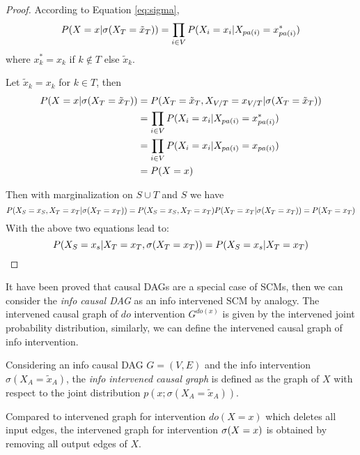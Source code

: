 \begin{proof}
	According to Equation \ref{eq:sigma}, 
	$$
	P(X=x|\mathrm{\sigma}(X_T=\tilde{x}_T)) = \prod_{i\in V} P(X_i = x_i|X_{pa(i)} = x^*_{pa(i)})
	$$
	where $x^*_k = x_k$ if $k \notin T$ else $\tilde{x}_k$.
	
	 Let $\tilde{x}_k = x_k$ for $k \in T$, then 
	\begin{align*}
		P(X=x|\mathrm{\sigma}(X_T=\tilde{x}_T))  &= P(X_T = \tilde{x}_T, X_{V/T} = x_{V/T}| \mathrm{\sigma}(X_T=\tilde{x}_T))  \\
		&=  \prod_{i\in V} P(X_i = x_i|X_{pa(i)} = x^*_{pa(i)}) \\
		&=  \prod_{i\in V} P(X_i = x_i|X_{pa(i)} = x_{pa(i)}) \\
		&= P(X=x) 
	\end{align*}
	
	Then with marginalization on $S \cup T$ and $S$ we have 
	$$
	P(X_S=x_S, X_T = {x}_T|\mathrm{\sigma}(X_T={x}_T)) = P(X_S=x_S, X_T = {x}_T) \\
	P( X_T = {x}_T|\mathrm{\sigma}(X_T={x}_T)) = P(X_T = {x}_T)
	$$ 
   With the above two equations lead to:
    $$P(X_S=x_s|X_T=x_T, \mathrm{\sigma}(X_T=x_T)) = P(X_S=x_s|X_T=x_T)$$
\end{proof}


It have been proved that causal DAGs are a special case of SCMs, then we can consider the \emph{info causal DAG} as an info intervened SCM {{by analogy}}. The intervened causal graph of $do$ intervention $G^{do(x)}$ is given by the intervened joint probability distribution, similarly, we can define the intervened causal graph of info intervention. 

\begin{Def}
	Considering an info causal DAG $G = (V, E)$ and the info intervention $\sigma(X_A = \tilde{x}_A)$, the \emph{info intervened causal graph} is defined as the graph of $X$ with respect to the joint distribution $p(x; \sigma(X_A=\tilde{x}_A))$.
\end{Def}

Compared to intervened graph for intervention $do(X=x)$ which deletes all input edges, the intervened graph for intervention $\mathrm{\sigma}(X=x)$ is obtained by removing all output edges of $X$.












